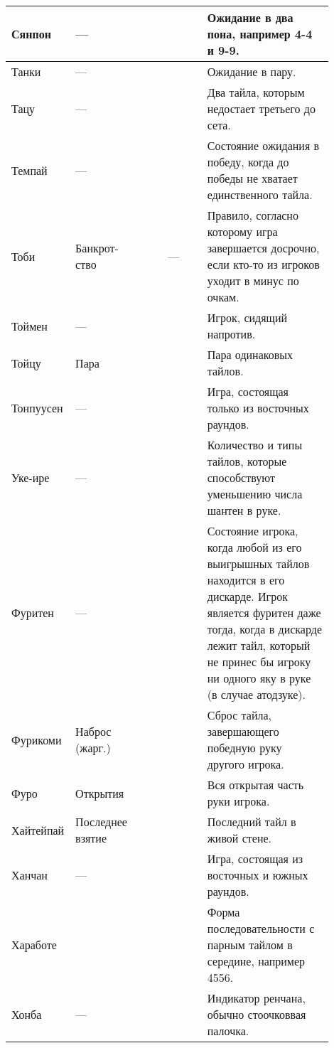 \begin{tabularx}{\linewidth}{|L{0.14\linewidth}|L{0.13\linewidth}|L{0.1\linewidth}|L{0.13\linewidth}|L{0.4\linewidth}|}
	\hline
	Сянпон & --- &  &  & Ожидание в два пона, например 4-4 и 9-9. \\
	\hline
	Танки & --- &  &  & Ожидание в пару. \\
	\hline
	Тацу & --- &  &  & Два тайла, которым недостает третьего до сета. \\
	\hline
	Темпай & --- &  &  & Состояние ожидания в победу, когда до победы не хватает единственного тайла. \\
	\hline
	Тоби & Банкрот-ство &  & --- & Правило, согласно которому игра завершается досрочно, если кто-то из игроков уходит в минус по очкам. \\
	\hline
	Тоймен & --- &  &  & Игрок, сидящий напротив. \\
	\hline
	Тойцу & Пара &  &  & Пара одинаковых тайлов. \\
	\hline
	Тонпуусен & --- &  &  & Игра, состоящая только из восточных раундов. \\
	\hline
	Уке-ире & --- &  &  & Количество и типы тайлов, которые способствуют уменьшению числа шантен в руке. \\
	\hline
	Фуритен & --- &  &  & Состояние игрока, когда любой из его выигрышных тайлов находится в его дискарде. Игрок является фуритен даже тогда, когда в дискарде лежит тайл, который не принес бы игроку ни одного яку в руке (в случае атодзуке). \\
	\hline
	Фурикоми & Наброс (жарг.) &  &  & Сброс тайла, завершающего победную руку другого игрока. \\
	\hline
	Фуро & Открытия &  &  & Вся открытая часть руки игрока. \\
	\hline
	Хайтейпай & Последнее взятие &  &  & Последний тайл в живой стене. \\
	\hline
	Ханчан & --- &  &  & Игра, состоящая из восточных и южных раундов. \\
	\hline
	Хаработе & & & & Форма последовательности с парным тайлом в середине, например 4556. \\
	\hline
	Хонба & --- &  &  & Индикатор ренчана, обычно стоочковвая палочка. \\

\end{tabularx}
